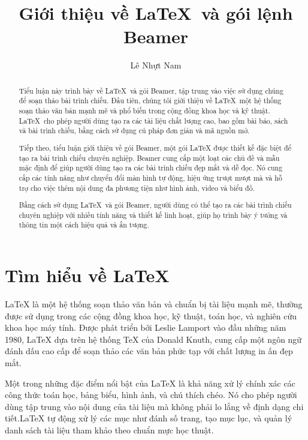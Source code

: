 \documentclass[a4paper,UKenglish,cleveref, autoref, thm-restate]{lipics-v2021}
\title{Giới thiệu về {\LaTeX}\ và gói lệnh Beamer} %
\author{Lê Nhựt Nam}{MSSV: 23C24004, Toán ứng dụng, Khóa 33 \and Bộ môn Khoa học Máy tính, Khoa Công nghệ Thông tin, Trường Đại học Khoa học Tự nhiên \and Đại học Quốc gia Thành phố Hồ Chí Minh, Việt Nam \and \url{http://lnhutnam.github.io} }{nam.lnhut@gmail.com}{https://orcid.org/0000-0002-2273-5089}{Được tài trợ bởi Tổ chức ABCXYZ}%
\begin{document}
\maketitle

\tableofcontents

\begin{abstract}
Tiểu luận này trình bày về \LaTeX\ và gói Beamer, tập trung vào việc sử dụng chúng để soạn thảo bài trình chiếu. Đầu tiên, chúng tôi giới thiệu về \LaTeX\, một hệ thống soạn thảo văn bản mạnh mẽ và phổ biến trong cộng đồng khoa học và kỹ thuật. \LaTeX\ cho phép người dùng tạo ra các tài liệu chất lượng cao, bao gồm bài báo, sách và bài trình chiếu, bằng cách sử dụng cú pháp đơn giản và mã nguồn mở.

Tiếp theo, tiểu luận giới thiệu về gói Beamer, một gói LaTeX được thiết kế đặc biệt để tạo ra bài trình chiếu chuyên nghiệp. Beamer cung cấp một loạt các chủ đề và mẫu mặc định để giúp người dùng tạo ra các bài trình chiếu đẹp mắt và dễ đọc. Nó cung cấp các tính năng như chuyển đổi màn hình tự động, hiệu ứng trượt mượt mà và hỗ trợ cho việc thêm nội dung đa phương tiện như hình ảnh, video và biểu đồ.

Bằng cách sử dụng \LaTeX\ và gói Beamer, người dùng có thể tạo ra các bài trình chiếu chuyên nghiệp với nhiều tính năng và thiết kế linh hoạt, giúp họ trình bày ý tưởng và thông tin một cách hiệu quả và ấn tượng.
\end{abstract}

\section{Tìm hiểu về {\LaTeX}}
\label{sec:latex-summary}

{\LaTeX} là một hệ thống soạn thảo văn bản và chuẩn bị tài liệu mạnh mẽ, thường được sử dụng trong các cộng đồng khoa học, kỹ thuật, toán học, và nghiên cứu khoa học máy tính. Được phát triển bởi Leslie Lamport vào đầu những năm 1980, {\LaTeX} dựa trên hệ thống TeX của Donald Knuth, cung cấp một ngôn ngữ đánh dấu cao cấp để soạn thảo các văn bản phức tạp với chất lượng in ấn đẹp mắt.

Một trong những đặc điểm nổi bật của {\LaTeX} là khả năng xử lý chính xác các công thức toán học, bảng biểu, hình ảnh, và chú thích chéo. Nó cho phép người dùng tập trung vào nội dung của tài liệu mà không phải lo lắng về định dạng chi tiết.{\LaTeX{}} tự động xử lý các mục như đánh số trang, tạo mục lục, và quản lý danh sách tài liệu tham khảo theo chuẩn mực học thuật.
\end{document}

